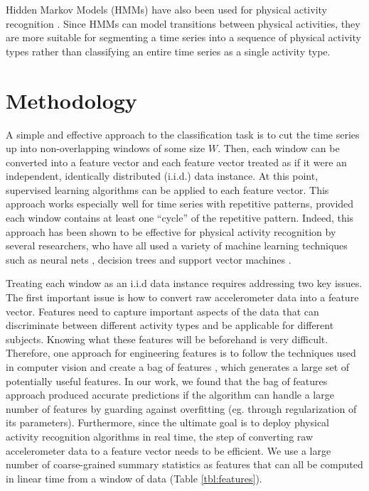 \documentclass[letterpaper]{article}
\begin{document}
Hidden Markov Models (HMMs) have also been used for physical activity recognition \cite{LCKBH:05}. Since HMMs can model transitions between physical activities, they are more suitable for segmenting a time series into a sequence of physical activity types rather than classifying an entire time series as a single activity type.

\section{Methodology}
A simple and effective approach to the classification task is to cut the time series up into non-overlapping windows of some size $W$. Then, each window can be converted into a feature vector and each feature vector treated as if it were an independent, identically distributed (i.i.d.) data instance. At this point, supervised learning algorithms can be applied to each feature vector. This approach works especially well for time series with repetitive patterns, provided each window contains at least one ``cycle'' of the repetitive pattern. Indeed, this approach has been shown to be effective for physical activity recognition by several researchers, who have all used a variety of machine learning techniques such as neural nets \cite{staudenmayer2009artificial}, decision trees \cite{bonomi2009detection} and support vector machines \cite{su2005estimation}.

Treating each window as an i.i.d data instance requires addressing two key issues. The first important issue is how to convert raw accelerometer data into a feature vector. Features need to capture important aspects of the data that can discriminate between different activity types and be applicable for different subjects. Knowing what these features will be beforehand is very difficult. Therefore, one approach for engineering features is to follow the techniques used in computer vision and create a bag of features \cite{zhang2012motion}, which generates a large set of potentially useful features. In our work, we found that the bag of features approach produced accurate predictions if the algorithm can handle a large number of features by guarding against overfitting (eg. through regularization of its parameters). Furthermore, since the ultimate goal is to deploy physical activity recognition algorithms in real time, the step of converting raw accelerometer data to a feature vector needs to be efficient. We use a large number of coarse-grained summary statistics as features that can all be computed in linear time from a window of data (Table \ref{tbl:features}).
\end{document}
